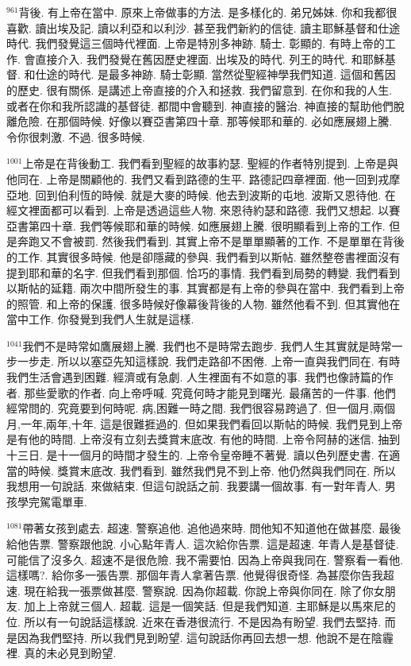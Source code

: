 \documentclass{book}
\begin{document}
$^{961}$背後.
有上帝在當中.
原來上帝做事的方法.
是多樣化的.
弟兄姊妹.
你和我都很喜歡.
讀出埃及記.
讀以利亞和以利沙.
甚至我們新約的信徒.
讀主耶穌基督和仕途時代.
我們發覺這三個時代裡面.
上帝是特別多神跡.
騎士.
彰顯的.
有時上帝的工作.
會直接介入.
我們發覺在舊因歷史裡面.
出埃及的時代.
列王的時代.
和耶穌基督.
和仕途的時代.
是最多神跡.
騎士彰顯.
當然從聖經神學我們知道.
這個和舊因的歷史.
很有關係.
是講述上帝直接的介入和拯救.
我們留意到.
在你和我的人生.
或者在你和我所認識的基督徒.
都間中會聽到.
神直接的醫治.
神直接的幫助他們脫離危險.
在那個時候.
好像以賽亞書第四十章.
那等候耶和華的.
必如應展翅上騰.
令你很刺激.
不過.
很多時候.

$^{1001}$上帝是在背後動工.
我們看到聖經的故事約瑟.
聖經的作者特別提到.
上帝是與他同在.
上帝是關顧他的.
我們又看到路德的生平.
路德記四章裡面.
他一回到戎摩亞地.
回到伯利恆的時候.
就是大麥的時候.
他去到波斯的屯地.
波斯又恩待他.
在經文裡面都可以看到.
上帝是透過這些人物.
來恩待約瑟和路德.
我們又想起.
以賽亞書第四十章.
我們等候耶和華的時候.
如應展翅上騰.
很明顯看到上帝的工作.
但是奔跑又不會被罰.
然後我們看到.
其實上帝不是單單顯著的工作.
不是單單在背後的工作.
其實很多時候.
他是卻隱藏的參與.
我們看到以斯帖.
雖然整卷書裡面沒有提到耶和華的名字.
但我們看到那個.
恰巧的事情.
我們看到局勢的轉變.
我們看到以斯帖的延籍.
兩次中間所發生的事.
其實都是有上帝的參與在當中.
我們看到上帝的照管.
和上帝的保護.
很多時候好像幕後背後的人物.
雖然他看不到.
但其實他在當中工作.
你發覺到我們人生就是這樣.

$^{1041}$我們不是時常如鷹展翅上騰.
我們也不是時常去跑步.
我們人生其實就是時常一步一步走.
所以以塞亞先知這樣說.
我們走路卻不困倦.
上帝一直與我們同在.
有時我們生活會遇到困難.
經濟或有急劇.
人生裡面有不如意的事.
我們也像詩篇的作者.
那些愛歌的作者.
向上帝呼喊.
究竟何時才能見到曙光.
最痛苦的一件事.
他們經常問的.
究竟要到何時呢.
病,困難一時之間.
我們很容易跨過了.
但一個月,兩個月,一年,兩年,十年.
這是很難捱過的.
但如果我們看回以斯帖的時候.
我們見到上帝是有他的時間.
上帝沒有立刻去獎賞末底改.
有他的時間.
上帝令阿赫的迷信.
抽到十三日.
是十一個月的時間才發生的.
上帝令皇帝睡不著覺.
讀以色列歷史書.
在適當的時候.
獎賞末底改.
我們看到.
雖然我們見不到上帝.
他仍然與我們同在.
所以我想用一句說話.
來做結束.
但這句說話之前.
我要講一個故事.
有一對年青人.
男孩學完駕電單車.

$^{1081}$帶著女孩到處去.
超速.
警察追他.
追他過來時.
問他知不知道他在做甚麼.
最後給他告票.
警察跟他說.
小心點年青人.
這次給你告票.
這是超速.
年青人是基督徒.
可能信了沒多久.
超速不是很危險.
我不需要怕.
因為上帝與我同在.
警察看一看他.
這樣嗎?.
給你多一張告票.
那個年青人拿著告票.
他覺得很奇怪.
為甚麼你告我超速.
現在給我一張票做甚麼.
警察說.
因為你超載.
你說上帝與你同在.
除了你女朋友.
加上上帝就三個人.
超載.
這是一個笑話.
但是我們知道.
主耶穌是以馬來尼的位.
所以有一句說話這樣說.
近來在香港很流行.
不是因為有盼望.
我們去堅持.
而是因為我們堅持.
所以我們見到盼望.
這句說話你再回去想一想.
他說不是在陰霾裡.
真的未必見到盼望.
\end{document}
